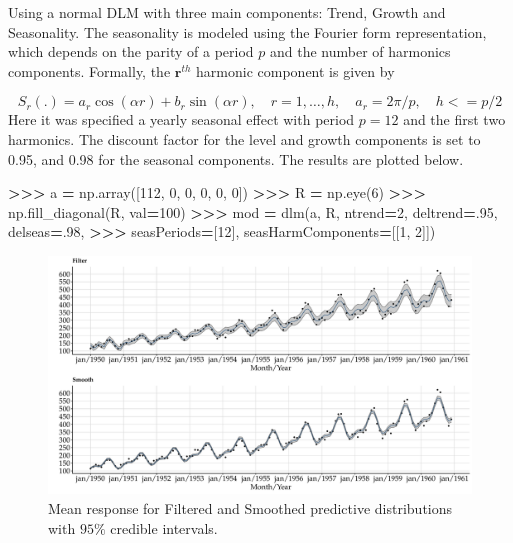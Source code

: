\documentclass[
]{article}
\newenvironment{Shaded}{\begin{snugshade}}{\end{snugshade}}
\newcommand{\DecValTok}[1]{\textcolor[rgb]{0.00,0.00,0.81}{#1}}
\newcommand{\FloatTok}[1]{\textcolor[rgb]{0.00,0.00,0.81}{#1}}
\newcommand{\NormalTok}[1]{#1}
\newcommand{\OperatorTok}[1]{\textcolor[rgb]{0.81,0.36,0.00}{\textbf{#1}}}
\begin{document}
Using a normal DLM with three main components: Trend, Growth and
Seasonality. The seasonality is modeled using the Fourier form
representation, which depends on the parity of a period \(p\) and the
number of harmonics components. Formally, the \(\mathbf{r}^{th}\)
harmonic component is given by

\[
S_r(.) = a_r \cos(\alpha r) + b_r \sin(\alpha r), \quad r=1, \dots, h, \quad 
a_r = 2\pi/p, \quad h <= p /2 
\] Here it was specified a yearly seasonal effect with period \(p=12\)
and the first two harmonics. The discount factor for the level and
growth components is set to 0.95, and 0.98 for the seasonal components.
The results are plotted below.

\begin{Shaded}
\begin{Highlighting}[]
\OperatorTok{\textgreater{}\textgreater{}\textgreater{}}\NormalTok{ a }\OperatorTok{=}\NormalTok{ np.array([}\DecValTok{112}\NormalTok{, }\DecValTok{0}\NormalTok{, }\DecValTok{0}\NormalTok{, }\DecValTok{0}\NormalTok{, }\DecValTok{0}\NormalTok{, }\DecValTok{0}\NormalTok{])}
\OperatorTok{\textgreater{}\textgreater{}\textgreater{}}\NormalTok{ R }\OperatorTok{=}\NormalTok{ np.eye(}\DecValTok{6}\NormalTok{)}
\OperatorTok{\textgreater{}\textgreater{}\textgreater{}}\NormalTok{ np.fill\_diagonal(R, val}\OperatorTok{=}\DecValTok{100}\NormalTok{)}
\OperatorTok{\textgreater{}\textgreater{}\textgreater{}}\NormalTok{ mod }\OperatorTok{=}\NormalTok{ dlm(a, R, ntrend}\OperatorTok{=}\DecValTok{2}\NormalTok{, deltrend}\OperatorTok{=}\FloatTok{.95}\NormalTok{, delseas}\OperatorTok{=}\FloatTok{.98}\NormalTok{,}
\OperatorTok{\textgreater{}\textgreater{}\textgreater{}}\NormalTok{           seasPeriods}\OperatorTok{=}\NormalTok{[}\DecValTok{12}\NormalTok{], seasHarmComponents}\OperatorTok{=}\NormalTok{[[}\DecValTok{1}\NormalTok{, }\DecValTok{2}\NormalTok{]])}
\end{Highlighting}
\end{Shaded}

\begin{figure}

{\centering \includegraphics[width=0.9\linewidth]{pybats_detection_files/figure-latex/plots for airpassangers example-1} 

}

\caption{Mean response for Filtered and Smoothed predictive distributions with $95\%$ credible intervals.}\label{fig:plots for airpassangers example}
\end{figure}
\end{document}
